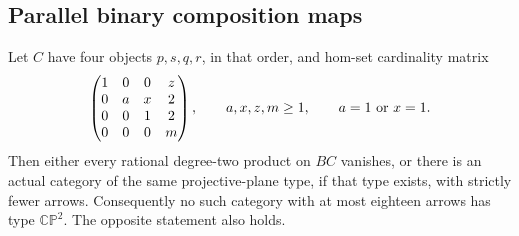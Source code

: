 \subsection{Parallel binary composition maps}

\begin{proposition}[Proved]
\label{CP2:A-four-binary-stalk-map-family}
Let $C$ have four objects $p,s,q,r$, in that order, and
hom-set cardinality matrix
\[
 \begin{pmatrix}
 1&0&0&z\\
 0&a&x&2\\
 0&0&1&2\\
 0&0&0&m
 \end{pmatrix},
 \qquad a,x,z,m\geq1,
 \qquad a=1\ \hbox{or}\ x=1.
\]
Then either every rational degree-two product on $BC$
vanishes, or there is an actual category of the same
projective-plane type, if that type exists, with
strictly fewer arrows. Consequently no such category
with at most eighteen arrows has type $\mathbb{CP}^2$.
The opposite statement also holds.
\end{proposition}
